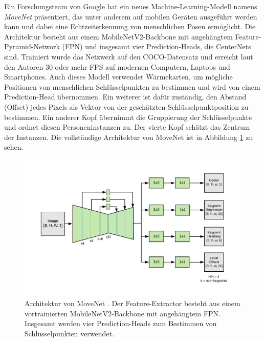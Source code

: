 Ein Forschungsteam von Google hat ein neues Machine-Learning-Modell namens
\textit{MoveNet} \cite{movenet} präsentiert, das unter anderem auf mobilen
Geräten ausgeführt werden kann und dabei eine Echtzeiterkennung von menschlichen
Posen ermöglicht. Die Architektur besteht aus einem MobileNetV2-Backbone mit
angehängtem Feature-Pyramid-Network (FPN) und insgesamt vier Prediction-Heads,
die CenterNets \cite{zhou2019objects} sind. Trainiert wurde das Netzwerk
auf den COCO-Datensatz und erreicht laut den Autoren 30 oder mehr FPS auf
modernen Computern, Laptops und Smartphones. Auch dieses Modell verwendet
Wärmekarten, um mögliche Positionen von menschlichen Schlüsselpunkten zu
bestimmen und wird von einem Prediction-Head übernommen. Ein weiterer ist dafür
zuständig, den Abstand (Offset) jedes Pixels als Vektor von der geschätzten
Schlüsselpunktposition zu bestimmen. Ein anderer Kopf übernimmt die Gruppierung
der Schlüsselpunkte und ordnet diesen Personeninstanzen zu. Der vierte Kopf
schätzt das Zentrum der Instanzen. Die vollständige Architektur von MoveNet ist
in Abbildung \ref{fig:movenet-architecture} zu sehen.

\begin{figure}
    \includegraphics[width=\textwidth]{images/movenet_architecture.png}
    \caption{Architektur von MoveNet \cite{movenet}. Der Feature-Extractor
    besteht aus einem vortrainierten MobileNetV2-Backbone mit angehängtem FPN.
    Insgesamt werden vier Prediction-Heads zum Bestimmen von Schlüsselpunkten
    verwendet.}
    \label{fig:movenet-architecture}
\end{figure}

